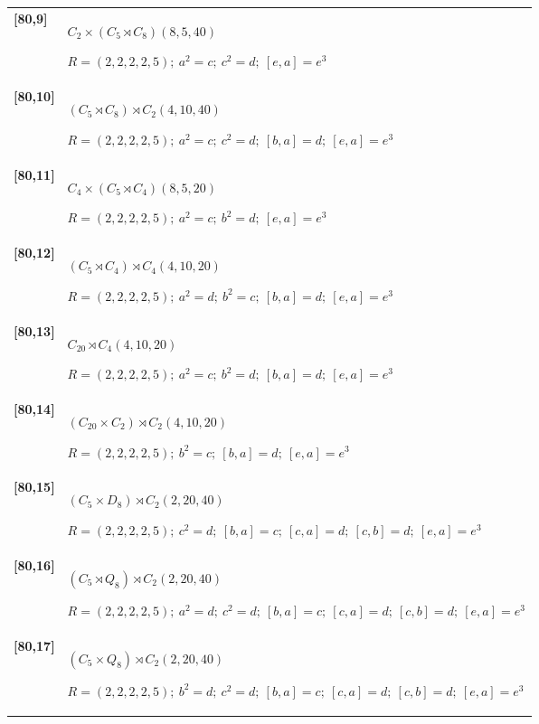 \documentclass[UTF8,fontset=fandol,11pt,a4paper]{ctexart}
\begin{document}
\begin{longtable}{@{}p{17mm}>{\raggedright\arraybackslash}p{141mm}@{}}
\textbf{[80,9]} & $C_{2}\times (C_{5}\rtimes C_{8})$\quad $(8,5,40)$\par\(R=(2,2,2,2,5);\allowbreak\ a^{2}=c;\allowbreak\ c^{2}=d;\allowbreak\ [e,a]=e^{3}\)\\[3pt]

\textbf{[80,10]} & $(C_{5}\rtimes C_{8})\rtimes C_{2}$\quad $(4,10,40)$\par\(R=(2,2,2,2,5);\allowbreak\ a^{2}=c;\allowbreak\ c^{2}=d;\allowbreak\ [b,a]=d;\allowbreak\ [e,a]=e^{3}\)\\[3pt]

\textbf{[80,11]} & $C_{4}\times (C_{5}\rtimes C_{4})$\quad $(8,5,20)$\par\(R=(2,2,2,2,5);\allowbreak\ a^{2}=c;\allowbreak\ b^{2}=d;\allowbreak\ [e,a]=e^{3}\)\\[3pt]

\textbf{[80,12]} & $(C_{5}\rtimes C_{4})\rtimes C_{4}$\quad $(4,10,20)$\par\(R=(2,2,2,2,5);\allowbreak\ a^{2}=d;\allowbreak\ b^{2}=c;\allowbreak\ [b,a]=d;\allowbreak\ [e,a]=e^{3}\)\\[3pt]

\textbf{[80,13]} & $C_{20}\rtimes C_{4}$\quad $(4,10,20)$\par\(R=(2,2,2,2,5);\allowbreak\ a^{2}=c;\allowbreak\ b^{2}=d;\allowbreak\ [b,a]=d;\allowbreak\ [e,a]=e^{3}\)\\[3pt]

\textbf{[80,14]} & $(C_{20}\times C_{2})\rtimes C_{2}$\quad $(4,10,20)$\par\(R=(2,2,2,2,5);\allowbreak\ b^{2}=c;\allowbreak\ [b,a]=d;\allowbreak\ [e,a]=e^{3}\)\\[3pt]

\textbf{[80,15]} & $(C_{5}\times D_{8})\rtimes C_{2}$\quad $(2,20,40)$\par\(R=(2,2,2,2,5);\allowbreak\ c^{2}=d;\allowbreak\ [b,a]=c;\allowbreak\ [c,a]=d;\allowbreak\ [c,b]=d;\allowbreak\ [e,a]=e^{3}\)\\[3pt]

\textbf{[80,16]} & $(C_{5}\rtimes Q_{8})\rtimes C_{2}$\quad $(2,20,40)$\par\(R=(2,2,2,2,5);\allowbreak\ a^{2}=d;\allowbreak\ c^{2}=d;\allowbreak\ [b,a]=c;\allowbreak\ [c,a]=d;\allowbreak\ [c,b]=d;\allowbreak\ [e,a]=e^{3}\)\\[3pt]

\textbf{[80,17]} & $(C_{5}\times Q_{8})\rtimes C_{2}$\quad $(2,20,40)$\par\(R=(2,2,2,2,5);\allowbreak\ b^{2}=d;\allowbreak\ c^{2}=d;\allowbreak\ [b,a]=c;\allowbreak\ [c,a]=d;\allowbreak\ [c,b]=d;\allowbreak\ [e,a]=e^{3}\)\\[3pt]


\end{longtable}
\end{document}
